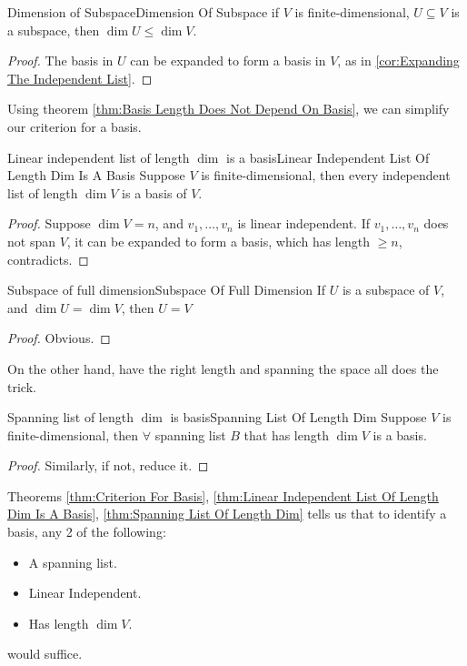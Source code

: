 \documentclass[../main.tex]{subfiles}
\begin{document}
\begin{theorem}{Dimension of Subspace}{Dimension Of Subspace}
if $V$ is finite-dimensional, $U \subseteq V$ is a subspace, then $\dim U \leq \dim V$.
\end{theorem}
\begin{proof}
	The basis in $U$ can be expanded to form a basis in $V$, as in \ref{cor:Expanding The Independent List}.
\end{proof}

Using theorem \ref{thm:Basis Length Does Not Depend On Basis}, we can simplify our criterion for a basis.
\begin{theorem}{Linear independent list of length $\dim$ is a basis}{Linear Independent List Of Length Dim Is A Basis}
Suppose $V$ is finite-dimensional,  then every independent list of length $\dim V$ is a basis of $V$.
\end{theorem}
\begin{proof}
Suppose $\dim V=n$, and $v_1, \ldots ,v_n$ is linear independent. If $v_1, \ldots ,v_n$ does not span $V$, it can be expanded to form a basis, which has length $\geq n$, contradicts.
\end{proof}
\begin{corollary}{Subspace of full dimension}{Subspace Of Full Dimension}
If $U$ is a subspace of $V$, and $\dim U=\dim V$, then $U=V$
\end{corollary}
\begin{proof}
Obvious.
\end{proof}

On the other hand, have the right length and spanning the space all does the trick.
\begin{theorem}{Spanning list of length $\dim$ is basis}{Spanning List Of Length Dim}
Suppose $V$ is finite-dimensional, then $\forall $ spanning list $B$ that has length $\dim V$ is a basis.
\end{theorem}
\begin{proof}
Similarly, if not, reduce it.
\end{proof}
\begin{remark}
	Theorems \ref{thm:Criterion For Basis}, \ref{thm:Linear Independent List Of Length Dim Is A Basis}, \ref{thm:Spanning List Of Length Dim} tells us that to identify a basis, any 2 of the following:
	\begin{itemize}
	\item A spanning list.
	\item Linear Independent.
	\item Has length $\dim V$.
	\end{itemize}
	would suffice.
\end{remark}
\end{document}
